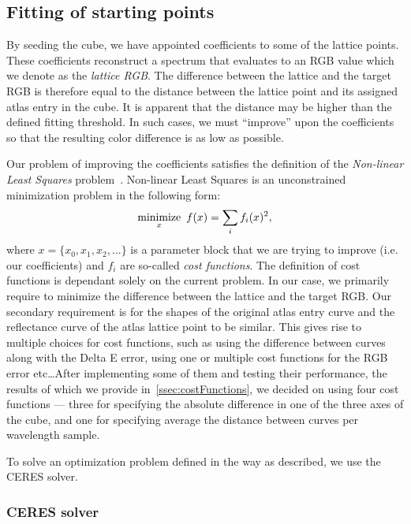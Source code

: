 \subsection{Fitting of starting points} \label{ssec:startingPointsFitting}

By seeding the cube, we have appointed coefficients to some of the lattice points. These coefficients reconstruct a spectrum that evaluates to an RGB value which we denote as the \emph{lattice RGB}. The difference between the lattice and the target RGB is therefore equal to the distance between the lattice point and its assigned atlas entry in the cube. It is apparent that the distance may be higher than the defined fitting threshold. In such cases, we must ``improve'' upon the coefficients so that the resulting color difference is as low as possible.

Our problem of improving the coefficients satisfies the definition of the \emph{Non-linear Least Squares} problem~\cite{nonLinearLeastSquares}. Non-linear Least Squares is an unconstrained minimization problem in the following form:
\begin{equation} \label{eq:nonLinearLeastSquares}
	 \underset{x}{\text{minimize}} \hspace{0.5em} f(x) = \sum_{i} f_{i}(x)^{2},
\end{equation}
where $x= \{x_{0}, x_{1}, x_{2}, ... \}$ is a parameter block that we are trying to improve (i.e. our coefficients) and $f_{i}$ are so-called \emph{cost functions}. The definition of cost functions is dependant solely on the current problem. In our case, we primarily require to minimize the difference between the lattice and the target RGB. Our secondary requirement is for the shapes of the original atlas entry curve and the reflectance curve of the atlas lattice point to be similar. This gives rise to multiple choices for cost functions, such as using the difference between curves along with the Delta E error, using one or multiple cost functions for the RGB error etc\ldots After implementing some of them and testing their performance, the results of which we provide in~\cref{ssec:costFunctions}, we decided on using four cost functions --- three for specifying the absolute difference in one of the three axes of the cube, and one for specifying average the distance between curves per wavelength sample.

To solve an optimization problem defined in the way as described, we use the CERES solver.

\subsubsection{CERES solver} \label{sssec:ceresSolver}

